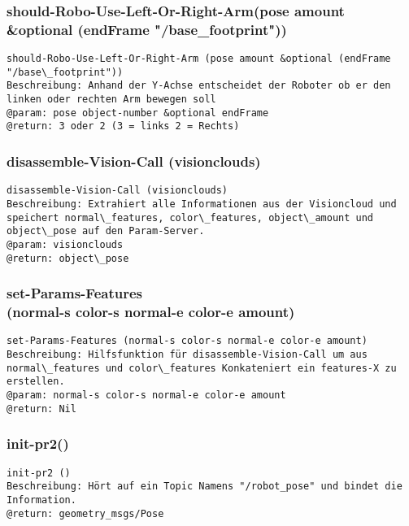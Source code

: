 \documentclass{suturo}
\begin{document}
\subsubsection{should-Robo-Use-Left-Or-Right-Arm(pose amount \\
\&optional (endFrame "/base\_footprint"))}
\begin{verbatim}
should-Robo-Use-Left-Or-Right-Arm (pose amount &optional (endFrame "/base\_footprint"))
Beschreibung: Anhand der Y-Achse entscheidet der Roboter ob er den linken oder rechten Arm bewegen soll
@param: pose object-number &optional endFrame
@return: 3 oder 2 (3 = links 2 = Rechts)
\end{verbatim}


\subsubsection{disassemble-Vision-Call (visionclouds)}
\begin{verbatim}
disassemble-Vision-Call (visionclouds)
Beschreibung: Extrahiert alle Informationen aus der Visioncloud und speichert normal\_features, color\_features, object\_amount und object\_pose auf den Param-Server.
@param: visionclouds
@return: object\_pose
\end{verbatim}



\subsubsection{set-Params-Features \\
(normal-s color-s normal-e color-e amount)}
\begin{verbatim}
set-Params-Features (normal-s color-s normal-e color-e amount)
Beschreibung: Hilfsfunktion für disassemble-Vision-Call um aus normal\_features und color\_features Konkateniert ein features-X zu erstellen. 
@param: normal-s color-s normal-e color-e amount
@return: Nil
\end{verbatim}


\subsubsection{init-pr2()}
\begin{verbatim}
init-pr2 ()
Beschreibung: Hört auf ein Topic Namens "/robot_pose" und bindet die Information.
@return: geometry_msgs/Pose
\end{verbatim}
\end{document}
